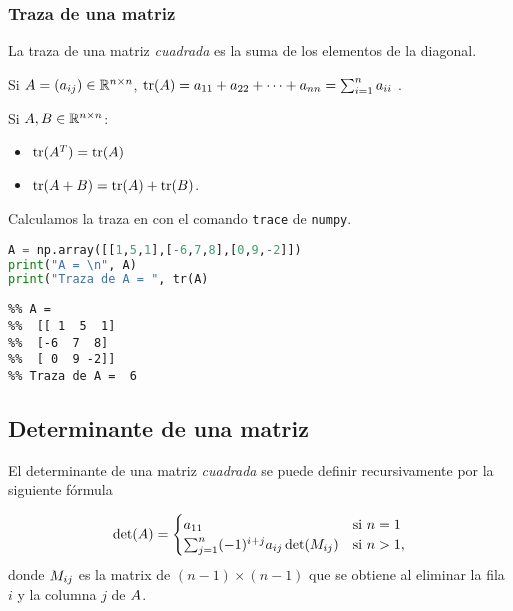 \subsubsection{Traza de una matriz}

La traza de una matriz \emph{cuadrada} es la suma de los elementos de la diagonal.

Si $\Ab = (a_{ij}) \in \R^{n \times n}$, $\tr(\Ab) = a_{11} + a_{22} + \dots + a_{nn} = \sum_{i=1}^n a_{ii}$ .

\begin{prop} Si $\Ab, \Bb \in \R^{n \times n}$:
\begin{itemize}
\item $\tr(\Ab^T)=\tr(\Ab)$
\item $\tr(\Ab+\Bb) = \tr(\Ab) + \tr(\Bb)$.
\end{itemize}
\end{prop}

Calculamos la traza en \python con el comando \texttt{trace} de \texttt{numpy}.

\begin{Shaded}
\begin{lstlisting}[language=Python]
A = np.array([[1,5,1],[-6,7,8],[0,9,-2]])
print("A = \n", A)
print("Traza de A = ", tr(A)
\end{lstlisting}
\end{Shaded}

\begin{verbatim}
%% A =
%%  [[ 1  5  1]
%%  [-6  7  8]
%%  [ 0  9 -2]]
%% Traza de A =  6
\end{verbatim}

\subsection{Determinante de una matriz}

El determinante de una matriz \emph{cuadrada} se puede definir recursivamente por la siguiente fórmula

$$
\det(\Ab)= \begin{cases}
a_{11} & \text{si } n = 1 \\
\sum _{j=1}^{n}(-1)^{i+j}a_{ij} \det(\Mb_{ij}) & \text{si } n > 1,
\end{cases}
$$
donde $\Mb_{ij}$ es la matrix de $(n-1) \times (n-1)$ que se obtiene al eliminar la fila $i$ y la columna $j$ de $\Ab$.

